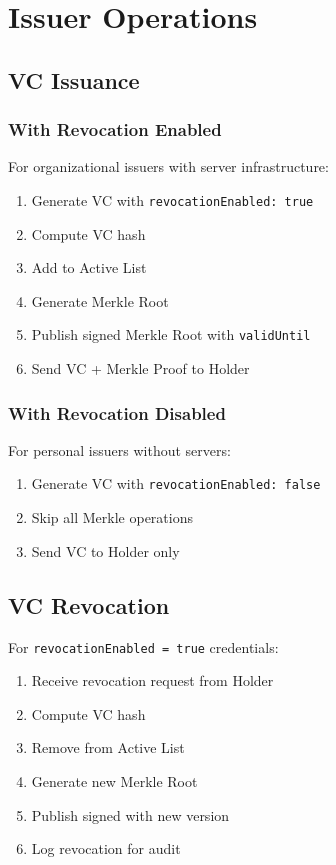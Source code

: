\section{Issuer Operations}

\subsection{VC Issuance}

\subsubsection{With Revocation Enabled}

For organizational issuers with server infrastructure:

\begin{enumerate}
  \item Generate VC with \texttt{revocationEnabled: true}
  \item Compute VC hash
  \item Add to Active List
  \item Generate Merkle Root
  \item Publish signed Merkle Root with \texttt{validUntil}
  \item Send VC + Merkle Proof to Holder
\end{enumerate}

\subsubsection{With Revocation Disabled}

For personal issuers without servers:

\begin{enumerate}
  \item Generate VC with \texttt{revocationEnabled: false}
  \item Skip all Merkle operations
  \item Send VC to Holder only
\end{enumerate}

\subsection{VC Revocation}

For \texttt{revocationEnabled = true} credentials:

\begin{enumerate}
  \item Receive revocation request from Holder
  \item Compute VC hash
  \item Remove from Active List
  \item Generate new Merkle Root
  \item Publish signed with new version
  \item Log revocation for audit
\end{enumerate}

